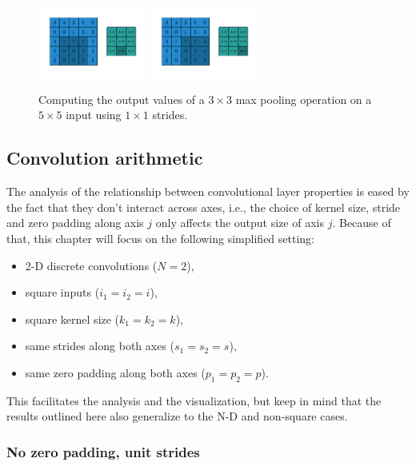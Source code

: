 \begin{figure}[p]
    \includegraphics[width=0.32\textwidth]{pdf/numerical_max_pooling_07.pdf}
    \includegraphics[width=0.32\textwidth]{pdf/numerical_max_pooling_08.pdf}
    \caption{\label{fig:numerical_max_pooling} Computing the output values of a
        $3 \times 3$ max pooling operation on a $5 \times 5$ input using $1
        \times 1$ strides.}
\end{figure}

\subsection{Convolution arithmetic}

The analysis of the relationship between convolutional layer properties is eased
by the fact that they don't interact across axes, i.e., the choice of kernel
size, stride and zero padding along axis $j$ only affects the output size of
axis $j$. Because of that, this chapter will focus on the following simplified
setting:

\begin{itemize}
    \item 2-D discrete convolutions ($N = 2$),
    \item square inputs ($i_1 = i_2 = i$),
    \item square kernel size ($k_1 = k_2 = k$),
    \item same strides along both axes ($s_1 = s_2 = s$),
    \item same zero padding along both axes ($p_1 = p_2 = p$).
\end{itemize}

This facilitates the analysis and the visualization, but keep in mind that the
results outlined here also generalize to the N-D and non-square cases.

\subsubsection{No zero padding, unit strides}

